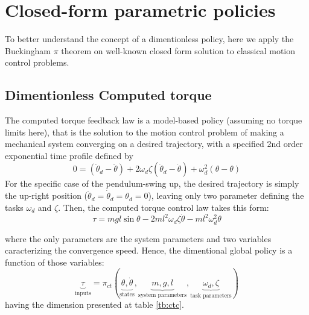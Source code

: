 \section{Closed-form parametric policies}

To better understand the concept of a dimentionless policy, here we apply the Buckingham $\pi$ theorem on well-known closed form solution to classical motion control problems.

\subsection{Dimentionless Computed torque}

The computed torque feedback law is a model-based policy (assuming no torque limits here), that is the solution to the motion control problem of making a mechanical system converging on a desired trajectory, with a specified 2nd order exponential time profile defined by
\begin{equation}
0 = (\ddot{\theta}_d - \ddot{\theta})+ 2 \omega_d \zeta (\dot{\theta}_d - \dot{\theta}) + \omega_d^2 (\theta - \theta)
\end{equation}
For the specific case of the pendulum-swing up, the desired trajectory is simply the up-right position ($\ddot{\theta}_d = \dot{\theta}_d = \theta_d = 0$), leaving only two parameter defining the tasks $\omega_d$ and $\zeta$. Then, the computed torque control law takes this form:
\begin{equation}
\tau = mgl \sin \theta - 2 m l^2 \omega_d \zeta \dot{\theta} - m l^2 \omega_d^2 \theta
\label{eq:ct}
\end{equation}

where the only parameters are the system parameters and two variables caracterizing the convergence speed. Hence, the dimentional global policy is a function of those variables:
\begin{equation}
\underbrace{\tau}_{\text{inputs}}
=
\pi_{ct} \left(
\underbrace{ \theta, \dot{\theta} }_{\text{states}},
\underbrace{ m , g , l }_{\text{system parameters}},
\underbrace{ \omega_d , \zeta }_{\text{task parameters}}
\right)
\label{tb:ctc}
\end{equation}
having the dimension presented at table \ref{tb:ctc}.

